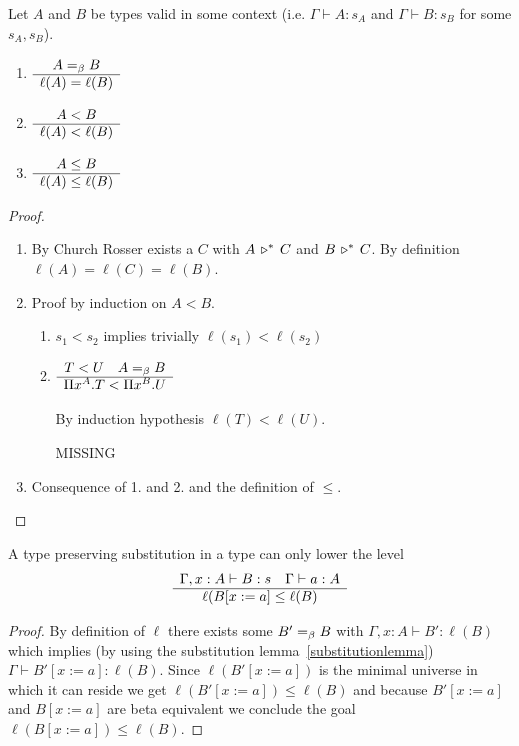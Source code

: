 \begin{lemma}
  Let $A$ and $B$ be types valid in some context (i.e. $\Gamma \vdash A : s_A$
  and $\Gamma \vdash B : s_B$ for some $s_A,s_B$).
  \begin{enumerate}
  \item $\begin{array}{c} A =_\beta B \\ \hline \ell(A) = \ell(B)\end{array}$
    
  \item $\begin{array}{c} A < B \\ \hline \ell(A) < \ell(B)\end{array}$
    
  \item $\begin{array}{c} A \le B \\ \hline \ell(A) \le \ell(B)\end{array}$
  \end{enumerate}

  \begin{proof} \
    \begin{enumerate}
    \item
      By Church Rosser exists a $C$ with $A \,\triangleright^*\, C$ and  $B \,\triangleright^*\,
      C$. By definition $\ell(A) = \ell(C) = \ell(B)$.
      
    \item Proof by induction on $A < B$.
    \begin{enumerate}
    \item $s_1 < s_2$ implies trivially $\ell(s_1) < \ell(s_2)$
      
    \item $\begin{array}{c} T < U \quad A =_\beta B \\ \hline \Pi x^A.T < \Pi x^B.U\end{array}$

      By induction hypothesis $\ell(T) < \ell(U)$.
      
       MISSING
    \end{enumerate}  
    
    \item
      Consequence of 1. and 2. and the definition of $\le$.
    \end{enumerate}
  \end{proof}
\end{lemma}



\begin{lemma}
  A type preserving substitution in a type can only lower the level
  $$
  \begin{array}{c} \Gamma,x:A \vdash B:s \quad \Gamma \vdash a:A \\ \hline \ell(B[x:=a] \le \ell(B)\end{array}
  $$
  \begin{proof}

    By definition of $\ell$ there exists some $B' =_\beta B$ with
    $\Gamma,x:A \vdash B': \ell(B)$
    which implies (by using the substitution lemma~\ref{substitutionlemma})
    $\Gamma \vdash B'[x:=a] : \ell(B)$.
    Since $\ell(B'[x:=a])$ is the minimal universe in which it can reside we
    get  $\ell(B'[x:=a]) \le \ell(B)$ and because $B'[x:=a]$ and $B[x:=a]$ are
    beta equivalent we conclude the goal $\ell(B[x:=a]) \le \ell(B)$.
    
  \end{proof}
\end{lemma}


